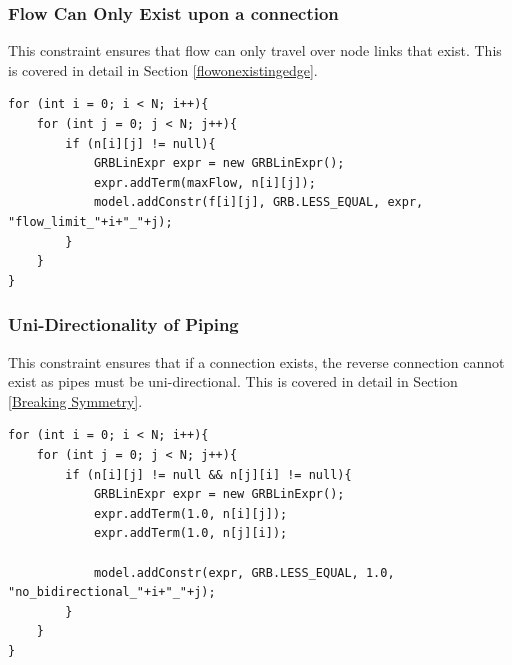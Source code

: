 \subsubsection{Flow Can Only Exist upon a connection}
This constraint ensures that flow can only travel over node links that exist. This is covered in detail in Section \ref{flowonexistingedge}.
\begin{lstlisting}
for (int i = 0; i < N; i++){
    for (int j = 0; j < N; j++){
        if (n[i][j] != null){
            GRBLinExpr expr = new GRBLinExpr();
            expr.addTerm(maxFlow, n[i][j]);
            model.addConstr(f[i][j], GRB.LESS_EQUAL, expr, "flow_limit_"+i+"_"+j);
        }
    }
}
\end{lstlisting}

\subsubsection{Uni-Directionality of Piping}
This constraint ensures that if a connection exists, the reverse connection cannot exist as pipes must be uni-directional. This is covered in detail in Section \ref{Breaking Symmetry}.
\begin{lstlisting}
for (int i = 0; i < N; i++){
    for (int j = 0; j < N; j++){
        if (n[i][j] != null && n[j][i] != null){
            GRBLinExpr expr = new GRBLinExpr();
            expr.addTerm(1.0, n[i][j]);
            expr.addTerm(1.0, n[j][i]);

            model.addConstr(expr, GRB.LESS_EQUAL, 1.0, "no_bidirectional_"+i+"_"+j);
        }
    }
}
\end{lstlisting}

